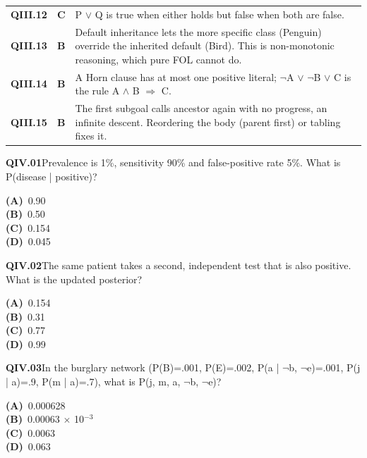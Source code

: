 \documentclass[11pt]{article}
\begin{document}
\begin{longtable}{>{\leavevmode\bfseries\color{navy}}p{1.3cm} c p{13.2cm}}
\rowcolor{ivory}QIII.12&\textbf{\color{leaf}C}&P $\vee$ Q is true when either holds but false when both are false.\\
QIII.13&\textbf{\color{leaf}B}&Default inheritance lets the more specific class (Penguin) override the inherited default (Bird). This is non-monotonic reasoning, which pure FOL cannot do.\\
\rowcolor{ivory}QIII.14&\textbf{\color{leaf}B}&A Horn clause has at most one positive literal; $\neg$A $\vee$ $\neg$B $\vee$ C is the rule A $\wedge$ B $\Rightarrow$ C.\\
QIII.15&\textbf{\color{leaf}B}&The first subgoal calls ancestor again with no progress, an infinite descent. Reordering the body (parent first) or tabling fixes it.\\
\end{longtable}
\newpage
{}
\begin{tcolorbox}[enhanced,breakable,colback=white,colframe=navyL,arc=2mm,boxrule=0.7pt,left=3mm,right=3mm,top=2mm,bottom=2mm]
\textbf{\color{navy}QIV.01}\quad Prevalence is 1\%, sensitivity 90\% and false-positive rate 5\%. What is P(disease | positive)?\hfill{}\par\smallskip
{\small \textbf{\color{navyL}(A)}\ 0.90\\[1pt]\textbf{\color{navyL}(B)}\ 0.50\\[1pt]\textbf{\color{navyL}(C)}\ 0.154\\[1pt]\textbf{\color{navyL}(D)}\ 0.045}
\end{tcolorbox}
\begin{tcolorbox}[enhanced,breakable,colback=white,colframe=navyL,arc=2mm,boxrule=0.7pt,left=3mm,right=3mm,top=2mm,bottom=2mm]
\textbf{\color{navy}QIV.02}\quad The same patient takes a second, independent test that is also positive. What is the updated posterior?\hfill{}\par\smallskip
{\small \textbf{\color{navyL}(A)}\ 0.154\\[1pt]\textbf{\color{navyL}(B)}\ 0.31\\[1pt]\textbf{\color{navyL}(C)}\ 0.77\\[1pt]\textbf{\color{navyL}(D)}\ 0.99}
\end{tcolorbox}
\begin{tcolorbox}[enhanced,breakable,colback=white,colframe=navyL,arc=2mm,boxrule=0.7pt,left=3mm,right=3mm,top=2mm,bottom=2mm]
\textbf{\color{navy}QIV.03}\quad In the burglary network (P(B)=.001, P(E)=.002, P(a | $\neg$b, $\neg$e)=.001, P(j | a)=.9, P(m | a)=.7), what is P(j, m, a, $\neg$b, $\neg$e)?\hfill{}\par\smallskip
{\small \textbf{\color{navyL}(A)}\ 0.000628\\[1pt]\textbf{\color{navyL}(B)}\ 0.00063 $\times$ 10$^{-3}$\\[1pt]\textbf{\color{navyL}(C)}\ 0.0063\\[1pt]\textbf{\color{navyL}(D)}\ 0.063}
\end{tcolorbox}
\end{document}

